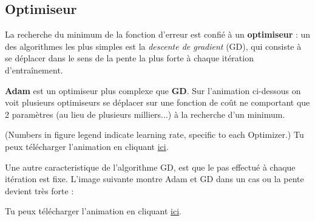 \documentclass{article}
\begin{document}
\subsection{Optimiseur}

La recherche du minimum de la fonction d'erreur est confié à un \textbf{optimiseur} :  
un des algorithmes les plus simples est la \textit{descente de gradient} (GD), 
qui consiste à se déplacer dans le sens de la pente la plus forte à chaque itération d'entraînement.

\textbf{Adam} est un optimiseur plus complexe que \textbf{GD}. Sur l'animation ci-dessous on voit 
plusieurs optimiseurs se déplacer sur une fonction de coût ne comportant que 2 paramètres
 (au lieu de plusieurs milliers...) à la recherche d'un minimum. 


\bigskip
(Numbers in figure legend indicate learning rate, specific to each Optimizer.)
Tu peux télécharger l'animation en cliquant \href{https://github.com/Jaewan-Yun/optimizer-visualization/raw/master/figures/movie11.gif}{ici}.


Une autre caracteristique de l'algorithme GD, est que le pas effectué à chaque itération est fixe. 
L'image suivante montre Adam et GD dans un cas ou la pente devient très forte :

Tu peux télécharger l'animation en cliquant \href{https://github.com/Jaewan-Yun/optimizer-visualization/raw/master/figures/movie9.gif}{ici}.
\end{document}

